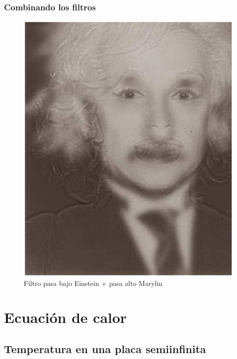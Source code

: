 \begin{frame}
\frametitle{Combinando los filtros}
\begin{figure}
    \includegraphics[scale=0.25]{Imagenes/Einstein_Marylin_BA_01.eps}
    \caption{Filtro pasa bajo Einstein + pasa alto Marylin}
\end{figure}
\end{frame}

\section{Ecuación de calor}
\subsection{Temperatura en una placa semiinfinita}

